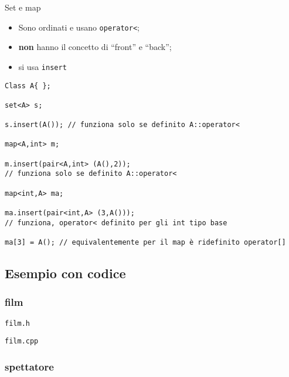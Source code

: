 \documentclass[xcolor={dvipsnames, svgnames, x11names, table}, 10pt]{beamer}
\begin{document}
\begin{frame}[t, fragile]{Set e map}

\begin{itemize}
    \item Sono ordinati e usano \texttt{operator<};
    \item \textbf{non} hanno il concetto di \enquote{front} e \enquote{back};
    \item si usa \texttt{insert}
\end{itemize}

\begin{verbatim}
Class A{ };

set<A> s;

s.insert(A()); // funziona solo se definito A::operator<

map<A,int> m;

m.insert(pair<A,int> (A(),2));
// funziona solo se definito A::operator<

map<int,A> ma;

ma.insert(pair<int,A> (3,A()));
// funziona, operator< definito per gli int tipo base

ma[3] = A(); // equivalentemente per il map è ridefinito operator[]
\end{verbatim}

\end{frame}

\subsection{Esempio con codice}

\subsubsection{film}

\begin{frame}{\texttt{film.h}}

    
\end{frame}

\begin{frame}{\texttt{film.cpp}}

    
\end{frame}

\subsubsection{spettatore}
\end{document}
